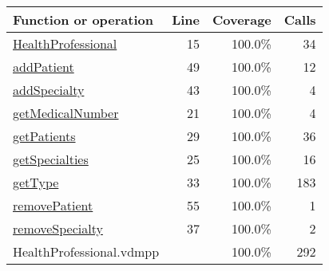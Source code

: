 \bigskip
\begin{longtable}{|l|r|r|r|}
\hline
Function or operation & Line & Coverage & Calls \\
\hline
\hline
\hyperref[HealthProfessional:15]{HealthProfessional} & 15&100.0\% & 34 \\
\hline
\hyperref[addPatient:49]{addPatient} & 49&100.0\% & 12 \\
\hline
\hyperref[addSpecialty:43]{addSpecialty} & 43&100.0\% & 4 \\
\hline
\hyperref[getMedicalNumber:21]{getMedicalNumber} & 21&100.0\% & 4 \\
\hline
\hyperref[getPatients:29]{getPatients} & 29&100.0\% & 36 \\
\hline
\hyperref[getSpecialties:25]{getSpecialties} & 25&100.0\% & 16 \\
\hline
\hyperref[getType:33]{getType} & 33&100.0\% & 183 \\
\hline
\hyperref[removePatient:55]{removePatient} & 55&100.0\% & 1 \\
\hline
\hyperref[removeSpecialty:37]{removeSpecialty} & 37&100.0\% & 2 \\
\hline
\hline
HealthProfessional.vdmpp & & 100.0\% & 292 \\
\hline
\end{longtable}

